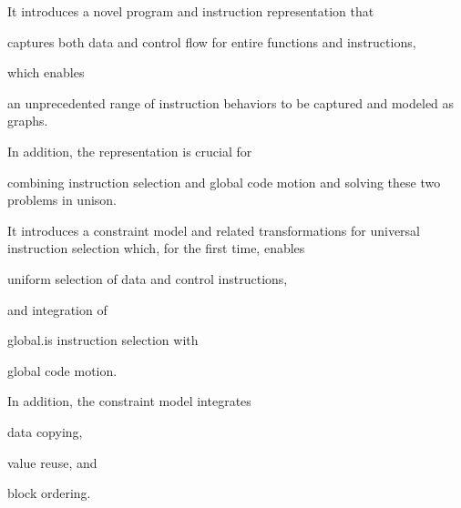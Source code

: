 \begin{contributions}
  \item {}
    It introduces a novel \gls{program} and \gls{instruction} representation
    that
    \begin{contributions}
      \item {}
        captures both data and control flow for entire \glspl{function} and
        \glspl{instruction},
    \end{contributions}
    which enables
    \begin{contributions}[resume]
      \item {}
        an unprecedented range of instruction behaviors to be captured and
        modeled as \glspl{graph}.
    \end{contributions}
    In addition, the representation is crucial for
    \begin{contributions}[resume]
      \item {}
        combining \gls{instruction selection} and \gls{global code motion} and
        solving these two problems in unison.
    \end{contributions}

  \item {}
    It introduces a \gls{constraint model} and related transformations for
    \gls{universal instruction selection} which, for the first time, enables
    \begin{contributions}
      \item {}
        uniform selection of data and control \glspl{instruction},
    \end{contributions}
    and integration of
    \begin{contributions}[resume]
      \item {}
        \gls{global.is} \gls{instruction selection} with
      \item {}
        \gls{global code motion}.
    \end{contributions}
    In addition, the \gls{constraint model} integrates
    \begin{contributions}[resume]
      \item {}
        \gls{data copying},
      \item {}
        \gls{value reuse}, and
      \item {}
        \gls{block ordering}.
    \end{contributions}


\end{contributions}
